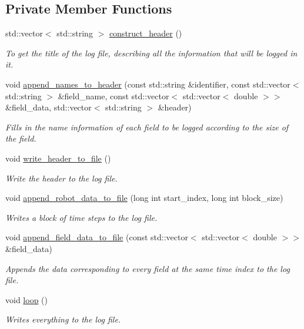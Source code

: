 \subsection*{Private Member Functions}
\begin{DoxyCompactItemize}
\item 
std\+::vector$<$ std\+::string $>$ \hyperlink{classrobot__interfaces_1_1RobotLogger_a9bcf9c2eaadd6e87b410daf65e0b3f07}{construct\+\_\+header} ()
\begin{DoxyCompactList}\small\item\em To get the title of the log file, describing all the information that will be logged in it. \end{DoxyCompactList}\item 
void \hyperlink{classrobot__interfaces_1_1RobotLogger_ab27971e5fd581e7cd8b8e449f5892637}{append\+\_\+names\+\_\+to\+\_\+header} (const std\+::string \&identifier, const std\+::vector$<$ std\+::string $>$ \&field\+\_\+name, const std\+::vector$<$ std\+::vector$<$ double $>$$>$ \&field\+\_\+data, std\+::vector$<$ std\+::string $>$ \&header)
\begin{DoxyCompactList}\small\item\em Fills in the name information of each field to be logged according to the size of the field. \end{DoxyCompactList}\item 
void \hyperlink{classrobot__interfaces_1_1RobotLogger_a3ff864106933593e16e5f3d6b5a8c4c2}{write\+\_\+header\+\_\+to\+\_\+file} ()
\begin{DoxyCompactList}\small\item\em Write the header to the log file. \end{DoxyCompactList}\item 
void \hyperlink{classrobot__interfaces_1_1RobotLogger_aae435545ce6d6b273b190859fdd30719}{append\+\_\+robot\+\_\+data\+\_\+to\+\_\+file} (long int start\+\_\+index, long int block\+\_\+size)
\begin{DoxyCompactList}\small\item\em Writes a block of time steps to the log file. \end{DoxyCompactList}\item 
void \hyperlink{classrobot__interfaces_1_1RobotLogger_ac37dfe19cbd427ba3ecf1238e8a64bed}{append\+\_\+field\+\_\+data\+\_\+to\+\_\+file} (const std\+::vector$<$ std\+::vector$<$ double $>$$>$ \&field\+\_\+data)
\begin{DoxyCompactList}\small\item\em Appends the data corresponding to every field at the same time index to the log file. \end{DoxyCompactList}\item 
void \hyperlink{classrobot__interfaces_1_1RobotLogger_ad21b7aa8531a57bb3740ac5282093815}{loop} ()
\begin{DoxyCompactList}\small\item\em Writes everything to the log file. \end{DoxyCompactList}\end{DoxyCompactItemize}
